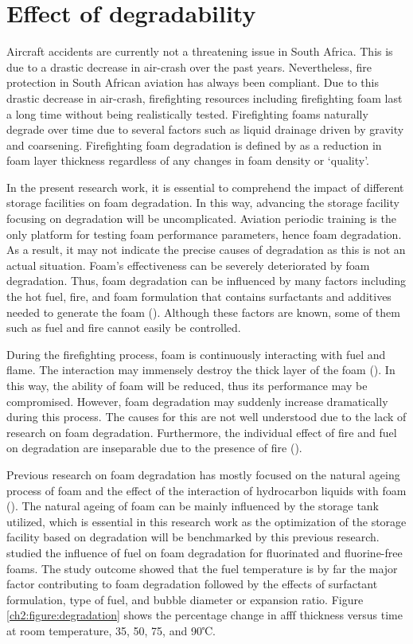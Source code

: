 \section{Effect of degradability}
Aircraft accidents are currently not a threatening issue in South Africa. This is due to a drastic decrease in air-crash over the past years. Nevertheless, fire protection in South African aviation has always been compliant. Due to this drastic decrease in air-crash, firefighting resources including firefighting foam last a long time without being realistically tested. Firefighting foams naturally degrade over time due to several factors such as liquid drainage driven by gravity and coarsening. Firefighting foam degradation is defined by \cite{hinnant2017influence} as a reduction in foam layer thickness regardless of any changes in foam density or ‘quality’. 

In the present research work, it is essential to comprehend the impact of different storage facilities on foam degradation. In this way, advancing the storage facility focusing on degradation will be uncomplicated. Aviation periodic training is the only platform for testing foam performance parameters, hence foam degradation. As a result, it may not indicate the precise causes of degradation as this is not an actual situation. Foam’s effectiveness can be severely deteriorated by foam degradation. Thus, foam degradation can be influenced by many factors including the hot fuel, fire, and foam formulation that contains surfactants and additives needed to generate the foam (\cite{hinnant2017influence}). Although these factors are known, some of them such as fuel and fire cannot easily be controlled.     

During the firefighting process, foam is continuously interacting with fuel and flame. The interaction may immensely destroy the thick layer of the foam (\cite{osei2015foam}). In this way, the ability of foam will be reduced, thus its performance may be compromised. However, foam degradation may suddenly increase dramatically during this process.  The causes for this are not well understood due to the lack of research on foam degradation. Furthermore, the individual effect of fire and fuel on degradation are inseparable due to the presence of fire (\cite{hinnant2017influence}).  

Previous research on foam degradation has mostly focused on the natural ageing process of foam and the effect of the interaction of hydrocarbon liquids with foam (\cite{osei2015foam, do2011numerical}).  The natural ageing of foam can be mainly influenced by the storage tank utilized, which is essential in this research work as the optimization of the storage facility based on degradation will be benchmarked by this previous research. \cite{hinnant2017influence} studied the influence of fuel on foam degradation for fluorinated and fluorine-free foams. The study outcome showed that the fuel temperature is by far the major factor contributing to foam degradation followed by the effects of surfactant formulation, type of fuel, and bubble diameter or expansion ratio. Figure \ref{ch2:figure:degradation} shows the percentage change in \acrshort{afff} thickness versus time at room temperature, 35, 50, 75, and 90℃.

